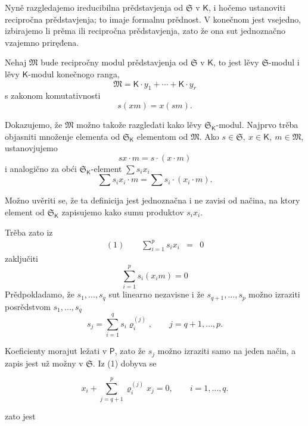 \documentclass[11pt]{article}
\begin{document}
Nyně razgledajemo ireducibilna prědstavjenja od \(\mathfrak S\) v \(\mathsf K\), i hočemo ustanoviti recipročna prědstavjenja; to imaje formalnu prědnost. V konečnom jest vsejedno, izbirajemo li prěma ili recipročna prědstavjenja, zato že ona sut jednoznačno vzajemno priręđena.

Nehaj \(\mathfrak M\) bude recipročny modul prědstavjenja od \(\mathfrak S\) v \(\mathsf K\), to jest lěvy \(\mathfrak S\)-modul i lěvy \(\mathsf K\)-modul konečnogo ranga,
\[
\mathfrak M=\mathsf K\cdot y_1+\cdots+\mathsf K\cdot y_r
\]
s zakonom komutativnosti
\[
s(xm)=x(sm).
\]

Dokazujemo, že \(\mathfrak M\) možno takože razgledati kako lěvy \(\mathfrak S_{\mathsf K}\)-modul. Najprvo trěba objasniti množenje elementa od \(\mathfrak S_{\mathsf K}\) elementom od \(\mathfrak M\). Ako \(s\in\mathfrak S,\ x\in\mathsf K,\ m\in\mathfrak M\), ustanovjujemo
\[
sx\cdot m=s\cdot(x\cdot m)
\]
i analogično za obći \(\mathfrak S_{\mathsf K}\)-element \(\sum s_ix_i\)
\[
\sum s_ix_i\cdot m=\sum s_i\cdot(x_i\cdot m).
\]

Možno uvěriti se, že ta definicija jest jednoznačna i ne zavisi od načina, na ktory element od \(\mathfrak S_{\mathsf K}\) zapisujemo kako sumu produktov \(s_ix_i\).

Trěba zato iz
\[
\begin{array}{rcl}
(1)\qquad \displaystyle\sum_{i=1}^{p}s_ix_i&=&0
\end{array}
\]
zaključiti
\[
\sum_{i=1}^{p}s_i(x_i m)=0
\]
Prědpokladamo, že \(s_1,\ldots,s_q\) sut linearno nezavisne i že \(s_{q+1},\ldots,s_p\) možno izraziti posrědstvom \(s_1,\ldots,s_q\)
\[
s_j=\sum_{i=1}^{q}s_i\varrho_i^{(j)},\qquad j=q+1,\ldots,p.
\]

Koeficienty morajut ležati v \(\mathsf P\), zato že \(s_j\) možno izraziti samo na jeden način, a zapis jest už možny v \(\mathfrak S\). Iz (1) dobyva se

\[
x_i+\sum_{j=q+1}^{p}\varrho_i^{(j)}x_j=0,\qquad i=1,\ldots,q.
\]

zato jest
\end{document}
